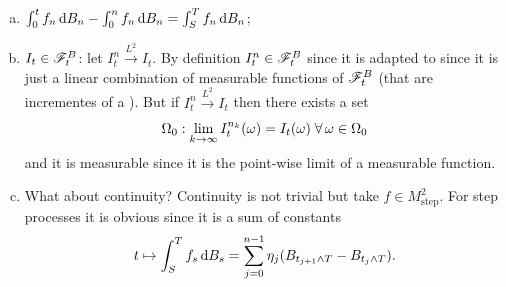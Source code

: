 \documentclass[crop=false, class=article]{standalone}
\begin{document}
\begin{enumerate}[a)]
	\item $\int_0^{t} f_n\mathop{}\!\mathrm{d} B_{n}-\int_0^n f_n\mathop{}\!\mathrm{d} B_{n}=\int_{S}^{T} f_n \mathop{}\!\mathrm{d} B_n$;
	\item $I_{t}\in\mathscr{F}^{B}_{t}$: let $I^{n}_{t}\xrightarrow{L^{2}}I_{t}$. By definition $I_t^n\in\mathscr{F}^{B}_t$ since it is adapted to \brm{} since it is just a linear combination of measurable functions of $\mathscr{F}_{t}^B$ (that are incrementes of a \brm). But if $I_t^n\xrightarrow{L^{2}}I_t$ then there exists a set 
	$$\Omega_0:\lim_{k\to\infty} I^{n_{k}}_{t}(\omega)=I_t(\omega)\;\forall\,\omega\in\Omega_0$$
	and it is measurable since it is the point-wise limit of a measurable function.
	\item What about continuity? Continuity is not trivial but take $f\in M^{2}_{\mathrm{step}}$. For step processes it is obvious since it is a sum of constants
	\begin{equation*}
		t\mapsto\int_{S}^{T} f_s\mathop{}\!\mathrm{d} B_{s}=\sum_{j=0}^{n-1}\eta_j(B_{t_{j+1}\wedge T}-B_{t_{j}\wedge T}).
	\end{equation*}
\end{enumerate}
\end{document}

